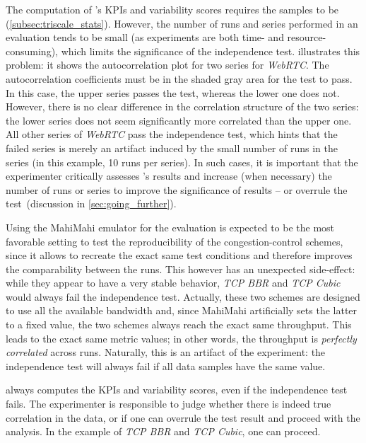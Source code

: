 The computation of \triscale's KPIs and variability scores requires the samples to be \iid (\cref{subsec:triscale_stats}).
However, the number of runs and series performed in an evaluation tends to be small (as experiments are both time- and resource-consuming), which limits the significance of the independence test.
 illustrates this problem: it shows the autocorrelation plot for two series for \textit{WebRTC}.
The autocorrelation coefficients must be in the shaded gray area for the test to pass.
In this case, the upper series passes the test, whereas the lower one does not.
However, there is no clear difference in the correlation structure of the two series: the lower series does not seem significantly more correlated than the upper one.
All other series of \textit{WebRTC} pass the independence test, which hints that the failed series is merely an artifact induced by the small number of runs in the series (in this example, 10 runs per series).
In such cases, it is important that the experimenter critically assesses \triscale's results and increase (when necessary) the number of runs or series to improve the significance of results -- or overrule the test~(discussion in \cref{sec:going_further}).

Using the MahiMahi emulator for the evaluation is expected to be the most favorable setting to test the reproducibility of the congestion-control schemes, since it allows to recreate the exact same test conditions and therefore improves the comparability between the runs.
This however has an unexpected side-effect: while they appear to have a very stable behavior, \emph{TCP BBR} and \emph{TCP Cubic} would always fail the independence test. Actually, these two schemes are designed to use all the available bandwidth and, since MahiMahi artificially sets the latter to a fixed value, the two schemes always reach the exact same throughput.
This leads to the exact same metric values; in other words, the throughput is \emph{perfectly correlated} across runs.
Naturally, this is an artifact of the experiment: the independence test will always fail if all data samples have the same value.

\triscale always computes the KPIs and variability scores, even if the independence test fails. The experimenter is responsible to judge whether there is indeed true correlation in the data, or if one can overrule the test result and proceed with the analysis.
In the example of \emph{TCP BBR} and \emph{TCP Cubic}, one can proceed.

